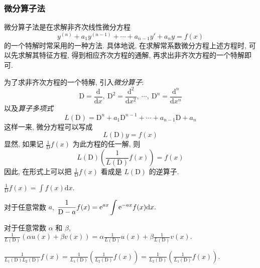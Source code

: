 \subsubsection{微分算子法}

微分算子法是在求解非齐次线性微分方程 $$y^{(n)}+a_1y^{(n-1)}+\cdots+a_{n-1}y'+a_ny=f(x)$$
的一个特解时常采用的一种方法. 具体地说, 在求解常系数微分方程上述方程时, 可以先求解其特征方程,
得到相应齐次方程的通解, 再求出非齐次方程的一个特解即可.

\begin{definition}[微分算子]
    为了求非齐次方程的一个特解, 引入\textit{微分算子}:
    $$\mathrm{D}=\frac{\mathrm{d}}{\mathrm{d}x},~\mathrm{D}^2=\frac{\mathrm{d^2}}{\mathrm{d}x^2},~\cdots,~\mathrm{D}^n=\frac{\mathrm{d}^n}{\mathrm{d}x^n}$$
    以及\textit{算子多项式} $$L(\mathrm{D})=\mathrm{D}^n+a_1\mathrm{D}^{n-1}+\cdots+a_{n-1}\mathrm{D}+a_n$$
    这样一来, 微分方程可以写成 $$L(\mathrm{D})y=f(x)$$
    显然, 如果记 $\displaystyle\frac{1}{\mathrm{D}}f(x)$ 为此方程的任一解, 则
    $$L(\mathrm{D})\left(\frac{1}{L(\mathrm{D})}f(x)\right)=f(x)$$
    因此, 在形式上可以把 $\displaystyle\frac{1}{\mathrm{D}}f(x)$ 看成是 $L(\mathrm{D})$ 的逆算子.
\end{definition}

\begin{theorem}
    $\displaystyle\frac{1}{\mathrm{D}}f(x)=\int f(x)\mathrm{d}x.$
\end{theorem}
\begin{theorem}
    对于任意常数 $a$, $\displaystyle\frac{1}{\mathrm{D}-a}f(x)=\mathrm{e} ^{ax}\int\mathrm{e} ^{-ax}f(x)\mathrm{d}x.$
\end{theorem}
\begin{theorem}
    对于任意常数 $\alpha$ 和 $\beta$, $\displaystyle\frac{1}{L(\mathrm{D})}(\alpha u(x)+\beta v(x))=\alpha\frac{1}{L(\mathrm{D})}u(x)+\beta\frac{1}{L(\mathrm{D})}v(x).$
\end{theorem}
\begin{theorem}
    $\displaystyle\frac{1}{L_1(\mathrm{D})L_2(\mathrm{D})}f(x)=\frac{1}{L_1(\mathrm{D})}\left(\frac{1}{L_2(\mathrm{D})}f(x)\right)=\frac{1}{L_2(\mathrm{D})}\left(\frac{1}{L_1(\mathrm{D})}f(x)\right).$
\end{theorem}

